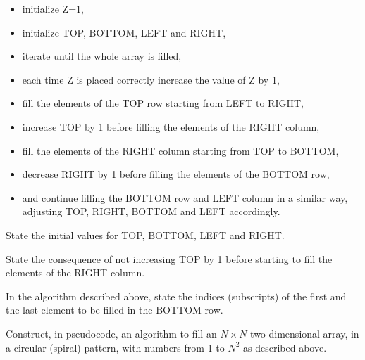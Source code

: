 \begin{exercise*}
\begin{itemize}
\item initialize Z=1,
\item initialize TOP, BOTTOM, LEFT and RIGHT,
\item iterate until the whole array is filled,
\item each time Z is placed correctly increase the value of Z by 1,
\item fill the elements of the TOP row starting from LEFT to RIGHT,
\item increase TOP by 1 before filling the elements of the RIGHT column,
\item fill the elements of the RIGHT column starting from TOP to BOTTOM,
\item decrease RIGHT by 1 before filling the elements of the BOTTOM row,
\item and continue filling the BOTTOM row and LEFT column in a similar way, adjusting TOP, RIGHT, BOTTOM and LEFT accordingly.
\end{itemize}

\begin{parts}
\item State the initial values for TOP, BOTTOM, LEFT and RIGHT.
\item State the consequence of not increasing TOP by 1 before starting to fill the elements of the RIGHT column.
\item In the algorithm described above, state the indices (subscripts) of the first and the last element to be filled in the BOTTOM row.
\item Construct, in pseudocode, an algorithm to fill an $N \times N$ two-dimensional array, in a circular (spiral) pattern, with numbers from 1 to $N^2$ as described above.
\end{parts}
\end{exercise*}